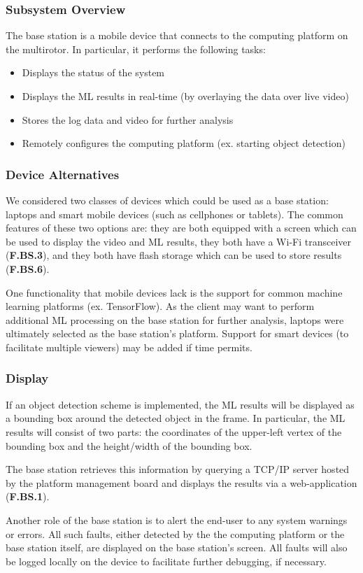 \subsubsection{Subsystem Overview}

The base station is a mobile device that connects to the computing platform on the multirotor. In particular, it performs the following tasks:
\begin{itemize}
    \item Displays the status of the system
    \item Displays the ML results in real-time (by overlaying the data over live video)
    \item Stores the log data and video for further analysis
    \item Remotely configures the computing platform (ex. starting object detection)
\end{itemize}

\subsubsection{Device Alternatives}
We considered two classes of devices which could be used as a base station: laptops and smart mobile devices (such as cellphones or tablets). The common features of these two options are: they are both equipped with a screen which can be used to display the video and ML results, they both have a Wi-Fi transceiver (\textbf{F.BS.3}), and they both have flash storage which can be used to store results (\textbf{F.BS.6}).

One functionality that mobile devices lack is the support for common machine learning platforms (ex. TensorFlow). As the client may want to perform additional ML processing on the base station for further analysis, laptops were ultimately selected as the base station's platform. Support for smart devices (to facilitate multiple viewers) may be added if time permits.

\subsubsection{Display}

If an object detection scheme is implemented, the ML results will be displayed as a bounding box around the detected object in the frame. In particular, the ML results will consist of two parts: the coordinates of the upper-left vertex of the bounding box and the height/width of the bounding box. 

The base station retrieves this information by querying a TCP/IP server hosted by the platform management board and displays the results via a web-application (\textbf{F.BS.1}).

Another role of the base station is to alert the end-user to any system warnings or errors. All such faults, either detected by the the computing platform or the base station itself, are displayed on the base station's screen. All faults will also be logged locally on the device to facilitate further debugging, if necessary.

